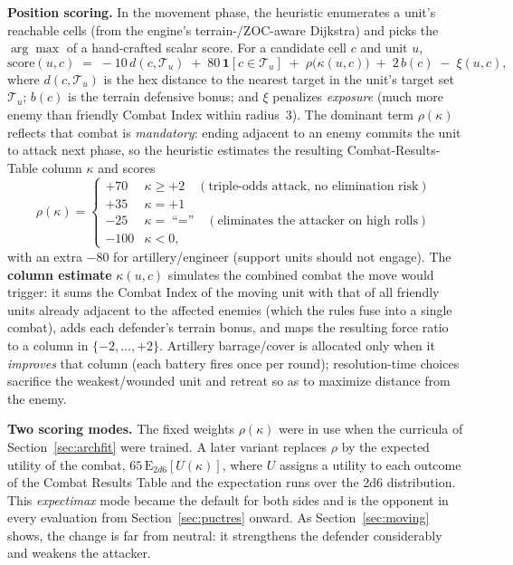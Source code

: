 \documentclass{article}
\begin{document}
\textbf{Position scoring.} In the movement phase, the heuristic enumerates a unit's
reachable cells (from the engine's terrain-/ZOC-aware Dijkstra) and picks the
$\arg\max$ of a hand-crafted scalar score. For a candidate cell $c$ and unit $u$,
\[
\text{score}(u,c) \;=\; -10\,d(c,\mathcal{T}_u)\;+\;80\,\mathbf{1}[c\in\mathcal{T}_u]
\;+\;\rho\big(\kappa(u,c)\big)\;+\;2\,b(c)\;-\;\xi(u,c),
\]
where $d(c,\mathcal{T}_u)$ is the hex distance to the nearest target in the unit's
target set $\mathcal{T}_u$; $b(c)$ is the terrain defensive bonus; and $\xi$ penalizes
\emph{exposure} (much more enemy than friendly Combat Index within radius~3). The
dominant term $\rho(\kappa)$ reflects that combat is \emph{mandatory}: ending adjacent
to an enemy commits the unit to attack next phase, so the heuristic estimates the
resulting Combat-Results-Table column $\kappa$ and scores
\[
\rho(\kappa)=\begin{cases}
+70 & \kappa\ge +2 \quad(\text{triple-odds attack, no elimination risk})\\
+35 & \kappa=+1\\
-25 & \kappa=\;\text{``=''}\quad(\text{eliminates the attacker on high rolls})\\
-100 & \kappa<0,
\end{cases}
\]
with an extra $-80$ for artillery/engineer (support units should not engage). The
\textbf{column estimate} $\kappa(u,c)$ simulates the combined combat the move would
trigger: it sums the Combat Index of the moving unit with that of all friendly units
already adjacent to the affected enemies (which the rules fuse into a single combat),
adds each defender's terrain bonus, and maps the resulting force ratio to a column in
$\{-2,\dots,+2\}$. Artillery barrage/cover is allocated only when it \emph{improves}
that column (each battery fires once per round); resolution-time choices sacrifice the
weakest/wounded unit and retreat so as to maximize distance from the enemy.

\textbf{Two scoring modes.} The fixed weights $\rho(\kappa)$ were in use when the
curricula of Section~\ref{sec:archfit} were trained. A later variant replaces $\rho$ by
the expected utility of the combat, $65\,\mathrm{E}_{2d6}[U(\kappa)]$, where $U$ assigns
a utility to each outcome of the Combat Results Table and the expectation runs over the
2d6 distribution. This \emph{expectimax} mode became the default for both sides and is
the opponent in every evaluation from Section~\ref{sec:puctres} onward. As
Section~\ref{sec:moving} shows, the change is far from neutral: it strengthens the
defender considerably and weakens the attacker.
\end{document}
